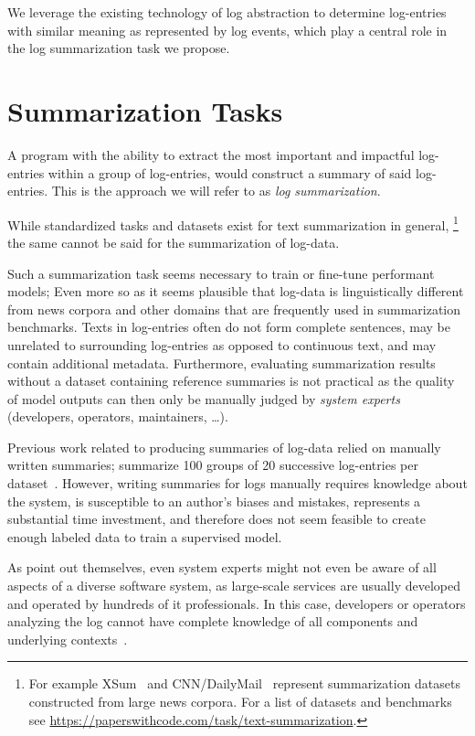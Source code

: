 We leverage the existing technology of log abstraction to determine log-entries
with similar meaning as represented by log events,
which play a central role in the log summarization task we propose.

\section{Summarization Tasks}\label{sec:summarization_tasks}

A program with the ability to extract the most important and impactful log-entries
within a group of log-entries, would construct a summary of said log-entries.
This is the approach we will refer to as \emph{log summarization}.

While standardized tasks and datasets exist for text summarization in general,%
\footnote{For example XSum~\parencite{xsum} and
CNN/DailyMail~\parencite{cnn_dailymail} represent summarization datasets
constructed from large news corpora.
For a list of datasets and benchmarks see \url{https://paperswithcode.com/task/text-summarization}.}
the same cannot be said for the summarization of log-data.

Such a summarization task seems necessary to train or fine-tune performant models;
Even more so as it seems plausible that log-data is linguistically different from news corpora
and other domains that are frequently used in summarization benchmarks.
Texts in log-entries often do not form complete sentences,
may be unrelated to surrounding log-entries as opposed to continuous text,
and may contain additional metadata.
Furthermore, evaluating summarization results without a dataset containing reference summaries is not practical
as the quality of model outputs can then only be manually judged by \emph{system experts} (developers, operators, maintainers, \ldots{}).

Previous work related to producing summaries of log-data relied on manually written summaries;
\citeauthor*{log_summary} summarize 100 groups of 20 successive log-entries per dataset~\parencite[6]{log_summary}.
However, writing summaries for logs manually requires knowledge about the system,
is susceptible to an author's biases and mistakes,
represents a substantial time investment,
and therefore does not seem feasible to create enough labeled data to train a supervised model.

As \citeauthor*{log_summary} point out themselves,
even system experts might not even be aware of all aspects of a diverse software system,
as large-scale services are usually developed and operated by hundreds of \ac{it} professionals.
In this case, developers or operators analyzing the log
cannot have complete knowledge of all components and underlying contexts~\parencite[1]{log_summary}.

